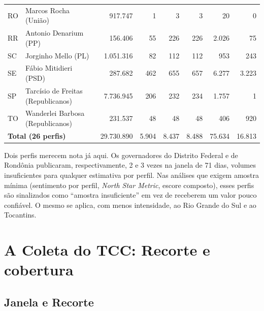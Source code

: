 \begin{table}[htb]
\begin{tabular}{llrrrrrr}
RO & Marcos Rocha (União) & 917.747 & 1 & 3 & 3 & 20 & 0 \\
RR & Antonio Denarium (PP) & 156.406 & 55 & 226 & 226 & 2.026 & 75 \\
SC & Jorginho Mello (PL) & 1.051.316 & 82 & 112 & 112 & 953 & 243 \\
SE & Fábio Mitidieri (PSD) & 287.682 & 462 & 655 & 657 & 6.277 & 3.223 \\
SP & Tarcísio de Freitas (Republicanos) & 7.736.945 & 206 & 232 & 234 & 1.757 & 1 \\
TO & Wanderlei Barbosa (Republicanos) & 231.537 & 48 & 48 & 48 & 406 & 920 \\
\midrule
\multicolumn{2}{l}{\textbf{Total (26 perfis)}} & 29.730.890 & 5.904 & 8.437 & 8.488 & 75.634 & 16.813 \\
\bottomrule
\end{tabular}
\end{table}

Dois perfis merecem nota já aqui. Os governadores do Distrito Federal e de Rondônia publicaram, respectivamente, 2 e 3 vezes na janela de 71 dias, volumes insuficientes para qualquer estimativa por perfil. Nas análises que exigem amostra mínima (sentimento por perfil, \emph{North Star Metric}, escore composto), esses perfis são sinalizados como ``amostra insuficiente'' em vez de receberem um valor pouco confiável. O mesmo se aplica, com menos intensidade, ao Rio Grande do Sul e ao Tocantins.

\section{A Coleta do TCC: Recorte e cobertura}\label{sec:coleta-tcc}

\subsection{Janela e Recorte}

